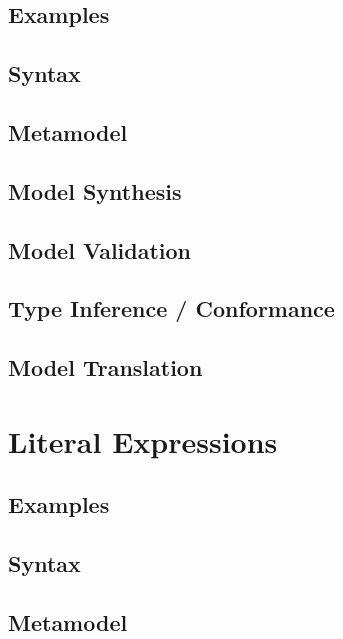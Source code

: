 \documentclass[a4paper,oneside,12pt, extrafontsizes]{memoir}
\begin{document}
    \section{Examples}
    

    \section{Syntax}
    

    \section{Metamodel}
    

    \section{Model Synthesis}

    \section{Model Validation}

    \section{Type Inference / Conformance}

    \section{Model Translation}

  \chapter{Literal Expressions}
  \label{ch:literals}
  

    \section{Examples}
    

    \section{Syntax}
    

    \section{Metamodel}
\end{document}
